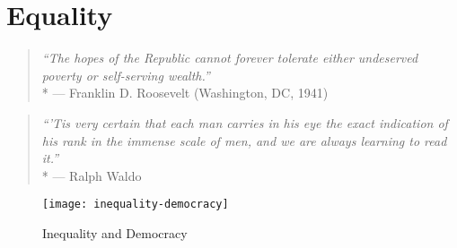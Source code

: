 \section{Equality}

\begin{quote}
	\emph{``The hopes of the Republic cannot forever tolerate either undeserved poverty or self-serving wealth.''}\\*
	--- Franklin D. Roosevelt (Washington, DC, 1941)
\end{quote}

\begin{quote}
	\emph{``'Tis very certain that each man carries in his eye the exact indication of his rank in the immense scale of men, and we are always learning to read it.''}\\*
	--- Ralph Waldo \cite{Emerson1860}
\end{quote}

 \begin{figure}[htbp]
	\centering
	\texttt{[image: inequality-democracy]}
	\caption{Inequality and Democracy}
	\label{fig:inequality-democracy}
\end{figure}





